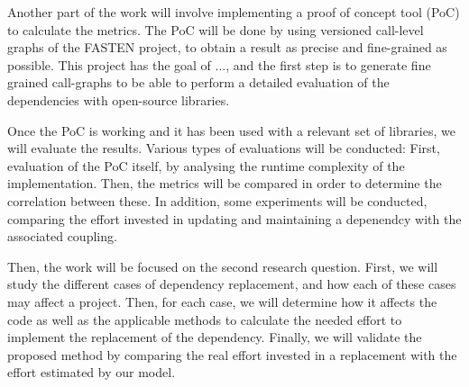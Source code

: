 \documentclass[a4paper]{article}
\begin{document}
Another part of the work will involve implementing a proof of concept tool (PoC) to calculate the metrics. The PoC will be done by using versioned call-level graphs of the FASTEN project, to obtain a result as precise and fine-grained as possible. This project has the goal of ..., and the first step is to generate fine grained call-graphs to be able to perform a detailed evaluation of the dependencies with open-source libraries.

Once the PoC is working and it has been used with a relevant set of libraries, we will evaluate the results. Various types of evaluations will be conducted: First, evaluation of the PoC itself, by analysing the runtime complexity of the implementation. Then, the metrics will be compared in order to determine the correlation between these. In addition, some experiments will be conducted, comparing the effort invested in updating and maintaining a depenendcy with the associated coupling.

Then, the work will be focused on the second research question. First, we will study the different cases of dependency replacement, and how each of these cases may affect a project. Then, for each case, we will determine how it affects the code as well as the applicable methods to calculate the needed effort to implement the replacement of the dependency. Finally, we will validate the proposed method by comparing the real effort invested in a replacement with the effort estimated by our model.



\end{document}
